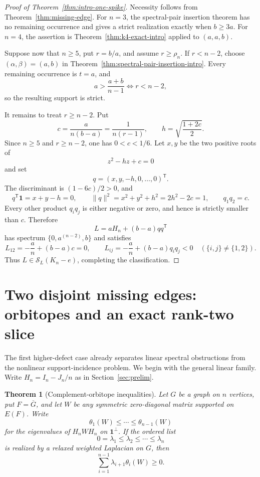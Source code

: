 \documentclass[11pt,reqno]{amsart}
\newtheorem{theorem}{Theorem}[section]
\theoremstyle{definition}
\theoremstyle{remark}
\newcommand{\one}{\mathbf 1}
\newcommand{\SL}{\mathcal S_L}
\begin{document}
\begin{proof}[Proof of Theorem~\ref{thm:intro-one-spike}]
Necessity follows from Theorem~\ref{thm:missing-edge}.  For $n=3$, the
spectral-pair insertion theorem has no remaining occurrence and gives a
strict realization exactly when $b\ge3a$.  For $n=4$, the assertion is
Theorem~\ref{thm:k4-exact-intro} applied to $(a,a,b)$.

Suppose now that $n\ge5$, put $r=b/a$, and assume
$r\ge\rho_n$.  If $r<n-2$, choose $(\alpha,\beta)=(a,b)$ in
Theorem~\ref{thm:spectral-pair-insertion-intro}.  Every remaining occurrence
is $t=a$, and
\[
  a>\frac{a+b}{n-1}\iff r<n-2,
\]
so the resulting support is strict.

It remains to treat $r\ge n-2$.  Put
\[
  c=\frac{a}{n(b-a)}=\frac1{n(r-1)},
  \qquad
  h=\sqrt{\frac{1+2c}{2}}.
\]
Since $n\ge5$ and $r\ge n-2$, one has $0<c<1/6$.  Let $x,y$ be the two
positive roots of
\[
  z^2-hz+c=0
\]
and set
\[
  q=(x,y,-h,0,\ldots,0)^{\mathsf T}.
\]
The discriminant is $(1-6c)/2>0$, and
\[
  q^{\mathsf T}\one=x+y-h=0,
  \qquad
  \|q\|^2=x^2+y^2+h^2=2h^2-2c=1,
  \qquad q_1q_2=c.
\]
Every other product $q_iq_j$ is either negative or zero, and hence is
strictly smaller than $c$.  Therefore
\[
  L=aH_n+(b-a)qq^{\mathsf T}
\]
has spectrum $\{0,a^{(n-2)},b\}$ and satisfies
\[
  L_{12}=-\frac an+(b-a)c=0,
  \qquad
  L_{ij}=-\frac an+(b-a)q_iq_j<0
  \quad(\{i,j\}\ne\{1,2\}).
\]
Thus $L\in\SL(K_n-e)$, completing the classification.
\end{proof}

\section{Two disjoint missing edges: orbitopes and an exact rank-two slice}
\label{sec:m2-frontier}

The first higher-defect case already separates linear spectral obstructions
from the nonlinear support-incidence problem.  We begin with the general
linear family.  Write $H_n=I_n-J_n/n$ as in
Section~\ref{sec:prelim}.

\begin{theorem}[Complement-orbitope inequalities]
\label{thm:complement-orbitope}
Let $G$ be a graph on $n$ vertices, put $F=\overline G$, and let $W$ be any
symmetric zero-diagonal matrix supported on $E(F)$.  Write
\[
  \theta_1(W)\le\cdots\le\theta_{n-1}(W)
\]
for the eigenvalues of $H_nWH_n$ on $\one^\perp$.  If the ordered list
\[
  0=\lambda_1\le\lambda_2\le\cdots\le\lambda_n
\]
is realized by a relaxed weighted Laplacian on $G$, then
\begin{equation}\label{eq:complement-orbitope}
  \sum_{i=1}^{n-1}\lambda_{i+1}\theta_i(W)\ge0.
\end{equation}
\end{theorem}
\end{document}
